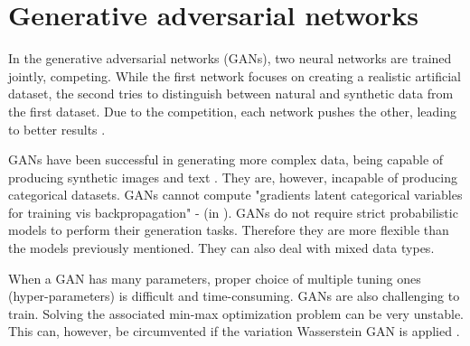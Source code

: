 
\section{Generative adversarial networks}
In the generative adversarial networks (GANs), two neural networks are trained jointly, competing. While the first network focuses on creating a realistic artificial dataset, the second tries to distinguish between natural and synthetic data from the first dataset. Due to the competition, each network pushes the other, leading to better results \citep{gans}. 

GANs have been successful in generating more complex data, being capable of producing synthetic images and text \citep{Mirza}. They are, however, incapable of producing categorical datasets. GANs cannot compute "gradients latent categorical variables for training vis backpropagation" - (in \cite{disclosure}). GANs do not require strict probabilistic models to perform their generation tasks. Therefore they are more flexible than the models previously mentioned. They can also deal with mixed data types.

When a GAN has many parameters, proper choice of multiple tuning ones (hyper-parameters) is difficult and time-consuming. GANs are also challenging to train. Solving the associated min-max optimization problem can be very unstable. This can, however, be circumvented if the variation Wasserstein GAN is applied \citep{gan}.

\begin{comment}
  
\section{Multiple imputation}
Multiple imputation is a method where several distinct possible datasets are created and the final dataset results from combining those datasets. This way, this approach is an optimal one to use in order to solve problems of missing data. 

The generation process starts with the creation of several copies of the dataset. These copies will have their missing values replaced by plausible imputed user values according to their original distribution.

The next set is the analysis of the created datasets. In this step, each dataset is analysed individually. This step is followed by combining these datasets in the proper output synthetical dataset.
\end{comment}

